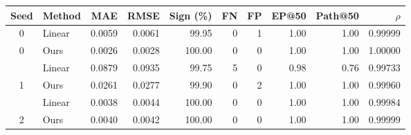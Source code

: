 \begin{tabular}{@{}clrrrrrrrr@{}}
\toprule
Seed & Method & MAE & RMSE & Sign (\%) & FN & FP & EP@50 & Path@50 & $\rho$ \\
\midrule
0 & Linear & 0.0059 & 0.0061 & 99.95 & 0 & 1 & 1.00 & 1.00 & 0.99999 \\
0 & Ours & 0.0026 & 0.0028 & 100.00 & 0 & 0 & 1.00 & 1.00 & 1.00000 \\
\addlinespace
1 & Linear & 0.0879 & 0.0935 & 99.75 & 5 & 0 & 0.98 & 0.76 & 0.99733 \\
1 & Ours & 0.0261 & 0.0277 & 99.90 & 0 & 2 & 1.00 & 1.00 & 0.99960 \\
\addlinespace
2 & Linear & 0.0038 & 0.0044 & 100.00 & 0 & 0 & 1.00 & 1.00 & 0.99984 \\
2 & Ours & 0.0040 & 0.0042 & 100.00 & 0 & 0 & 1.00 & 1.00 & 0.99999 \\
\bottomrule
\end{tabular}
